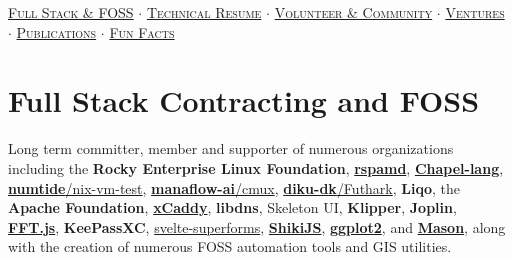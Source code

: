 \documentclass[11pt,letterpaper]{article}
\newcommand{\cvlink}[2]{\href{#1}{\color{linkcolor}#2}}
\begin{document}
\vspace{0.5em}

\begin{center}
\small\color{muted}
\hyperref[sec:foss]{\textsc{Full Stack \& FOSS}} $\cdot$ 
\hyperref[sec:resume]{\textsc{Technical Resume}} $\cdot$
\hyperref[sec:volunteer]{\textsc{Volunteer \& Community}} $\cdot$
\hyperref[sec:ventures]{\textsc{Ventures}} $\cdot$ 
\hyperref[sec:publications]{\textsc{Publications}} $\cdot$
\hyperref[sec:funfacts]{\textsc{Fun Facts}}
\end{center}

\vspace{0.5em}

\section{Full Stack Contracting and FOSS}
\label{sec:foss}

Long term committer, member and supporter of numerous organizations including the \textbf{Rocky Enterprise Linux Foundation}, \cvlink{https://github.com/rspamd/rspamd/pull/5923}{\textbf{rspamd}}, \cvlink{https://github.com/chapel-lang/mason-registry/pull/77}{\textbf{Chapel-lang}}, \cvlink{https://github.com/numtide/nix-vm-test/pull/172}{\textbf{numtide}/nix-vm-test}, \cvlink{https://github.com/manaflow-ai/cmux/pull/1877}{\textbf{manaflow-ai}/cmux}, \cvlink{https://github.com/diku-dk/futhark/pull/2365}{\textbf{diku-dk}/Futhark}, \textbf{Liqo}, the \textbf{Apache Foundation}, \cvlink{https://github.com/caddyserver/xcaddy/pull/238}{\textbf{xCaddy}}, \textbf{libdns}, Skeleton UI, \textbf{Klipper}, \textbf{Joplin}, \cvlink{https://github.com/indutny/fft.js}{\textbf{FFT.js}}, \textbf{KeePassXC}, \cvlink{https://github.com/ciscoheat/sveltekit-superforms/pull/678}{svelte-superforms}, \cvlink{https://github.com/shikijs/shiki}{\textbf{ShikiJS}}, \cvlink{https://github.com/tidyverse/ggplot2}{\textbf{ggplot2}}, and \cvlink{https://github.com/Jesssullivan/quickchpl}{\textbf{Mason}}, along with the creation of numerous FOSS automation tools and GIS utilities.
\end{document}
